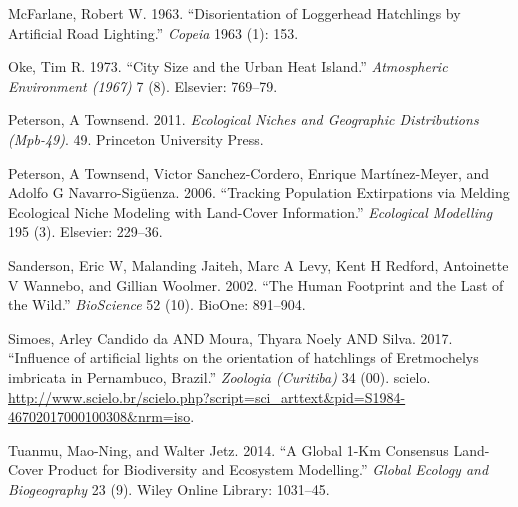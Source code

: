 \documentclass[]{article}
\begin{document}
\hypertarget{ref-mcfarlane1963disorientation}{}
McFarlane, Robert W. 1963. ``Disorientation of Loggerhead Hatchlings by
Artificial Road Lighting.'' \emph{Copeia} 1963 (1): 153.

\hypertarget{ref-oke1973city}{}
Oke, Tim R. 1973. ``City Size and the Urban Heat Island.''
\emph{Atmospheric Environment (1967)} 7 (8). Elsevier: 769--79.

\hypertarget{ref-peterson2011ecological}{}
Peterson, A Townsend. 2011. \emph{Ecological Niches and Geographic
Distributions (Mpb-49)}. 49. Princeton University Press.

\hypertarget{ref-peterson2006tracking}{}
Peterson, A Townsend, Victor Sanchez-Cordero, Enrique Martínez-Meyer,
and Adolfo G Navarro-Sigüenza. 2006. ``Tracking Population Extirpations
via Melding Ecological Niche Modeling with Land-Cover Information.''
\emph{Ecological Modelling} 195 (3). Elsevier: 229--36.

\hypertarget{ref-sanderson2002human}{}
Sanderson, Eric W, Malanding Jaiteh, Marc A Levy, Kent H Redford,
Antoinette V Wannebo, and Gillian Woolmer. 2002. ``The Human Footprint
and the Last of the Wild.'' \emph{BioScience} 52 (10). BioOne: 891--904.

\hypertarget{ref-SIMOES2017}{}
Simoes, Arley Candido da AND Moura, Thyara Noely AND Silva. 2017.
``Influence of artificial lights on the orientation of hatchlings of
Eretmochelys imbricata in Pernambuco, Brazil.'' \emph{Zoologia
(Curitiba)} 34 (00). scielo.
\url{http://www.scielo.br/scielo.php?script=sci_arttext\&pid=S1984-46702017000100308\&nrm=iso}.

\hypertarget{ref-tuanmu2014global}{}
Tuanmu, Mao-Ning, and Walter Jetz. 2014. ``A Global 1-Km Consensus
Land-Cover Product for Biodiversity and Ecosystem Modelling.''
\emph{Global Ecology and Biogeography} 23 (9). Wiley Online Library:
1031--45.
\end{document}
